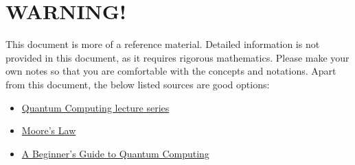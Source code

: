 \documentclass{article}
\begin{document}
\newpage
\section{WARNING!}
This document is more of a reference material. Detailed information is not provided in this document, as it requires rigorous mathematics. Please make your own notes so that you are comfortable with the concepts and notations. Apart from this document, the below listed sources are good options:
\begin{itemize}
    \item \href{https://www.youtube.com/watch?v=ZuvCUU2jD30&list=PLxhaPrr4aQ9lnBEOoy7r6KNlrTG_obLgr}{Quantum Computing lecture series}
    \item \href{https://www.youtube.com/watch?v=rtI5wRyHpTg}{Moore's Law }
    \item \href{https://www.youtube.com/watch?v=JRIPV0dPAd4}{A Beginner's Guide to Quantum Computing}
    
\end{itemize}
\end{document}
